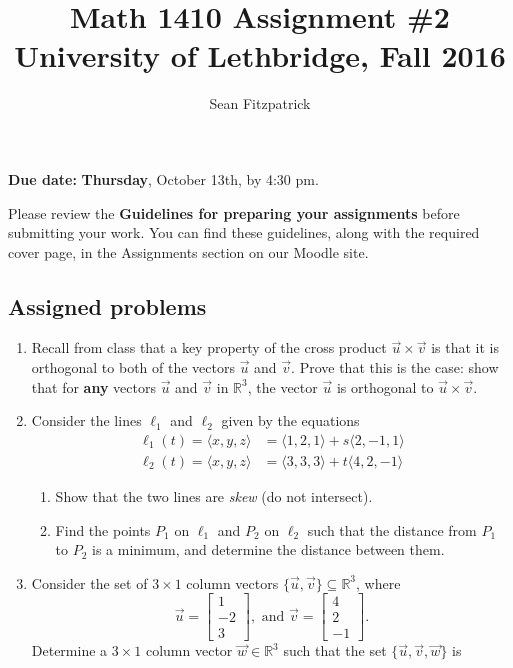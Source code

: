 \documentclass[letterpaper,12pt]{amsart}
\title{Math 1410 Assignment \#2\\University of Lethbridge, Fall 2016}
\author{Sean Fitzpatrick}
\newcommand{\R}{\mathbb{R}}
\newcommand{\bbm}{\begin{bmatrix}}
\newcommand{\ebm}{\end{bmatrix}}
\begin{document}
 \maketitle

{\bf Due date:} {\bf Thursday}, October 13th, by 4:30 pm.

\bigskip

Please review the {\bf Guidelines for preparing your assignments} before submitting your work. You can find these guidelines, along with the required cover page, in the Assignments section on our Moodle site.



\subsection*{Assigned problems}
\begin{enumerate}
\item Recall from class that a key property of the cross product $\vec{u}\times\vec{v}$ is that it is orthogonal to both of the vectors $\vec{u}$ and $\vec{v}$. Prove that this is the case: show that for \textbf{any} vectors $\vec{u}$ and $\vec{v}$ in $\R^3$, the vector $\vec{u}$ is orthogonal to $\vec{u}\times \vec{v}$.

\bigskip

\item Consider the lines $\ell_1$ and $\ell_2$ given by the equations
\begin{align*}
 \ell_1(t) = \langle x,y,z\rangle & = \langle 1,2,1\rangle+s\langle 2,-1,1\rangle\\
 \ell_2(t) = \langle x,y,z\rangle & = \langle 3,3,3\rangle+t\langle 4,2,-1\rangle
\end{align*}

\medskip

\begin{enumerate}
 \item Show that the two lines are \textit{skew} (do not intersect). 
 \item Find the points $P_1$ on $\ell_1$ and $P_2$ on $\ell_2$ such that the distance from $P_1$ to $P_2$ is a minimum, and determine the distance between them.
 \end{enumerate}

\bigskip

\item Consider the set of $3\times 1$ column vectors $\{\vec{u},\vec{v}\}\subseteq\R^3$, where
\[
 \vec{u} = \bbm 1\\-2\\3\ebm, \text{ and } \vec{v} = \bbm 4\\2\\-1\ebm.
\]
Determine a $3\times 1$ column vector $\vec{w}\in\R^3$ such that the set $\{\vec{u},\vec{v},\vec{w}\}$ is


\end{enumerate}
\end{document}
